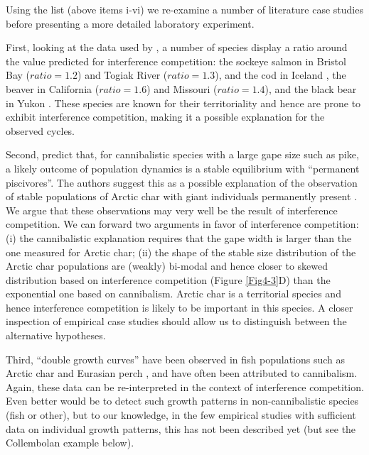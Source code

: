 Using the list (above items i-vi) we re-examine a number of literature case
studies before presenting a more detailed laboratory experiment. 

First, looking at the data used by \textcite{murdoch2002a}, a number of species
display a ratio around the value predicted for interference competition: the
sockeye salmon in Bristol Bay ($ratio=1.2$) and Togiak River ($ratio=1.3$), and
the cod in Iceland \autocite[$ratio=1.6$,]{myers1995a}, the beaver in California
($ratio=1.6$) and Missouri ($ratio=1.4$), and the black bear in Yukon
\autocite[$ratio=1.5$,]{novak1987a}.
These species are known for their territoriality
\autocites{foote1990a,nolet1994a,marshall2010a,sverdrup2011a,ping2011a} and hence
are prone to exhibit interference competition, making it a possible explanation
for the observed cycles.

Second, \textcite{claessen2002a} predict that, for cannibalistic species with a
large gape size such as pike, a likely outcome of population dynamics is a
stable equilibrium with “permanent piscivores”. The authors suggest this as a
possible explanation of the observation of stable populations of Arctic char
with giant individuals permanently present
\autocites{parker1991a,griffiths1994a,hammar2000a}. We argue that these
observations may very well be the result of interference competition. We can
forward two arguments in favor of interference competition: (i) the
cannibalistic explanation requires that the gape width is larger than the one
measured for Arctic char; (ii) the shape of the stable size distribution of the
Arctic char populations are (weakly) bi-modal and hence closer to skewed
distribution based on interference competition (Figure \ref{Fig4-3}D) than the
exponential one based on cannibalism. Arctic char is a territorial species and
hence interference competition is likely to be important in this species. A
closer inspection of empirical case studies should allow us to distinguish
between the alternative hypotheses.

Third, “double growth curves” have been observed in fish populations such as
Arctic char and Eurasian perch \autocites{cren1992a}, and have often been
attributed to cannibalism. Again, these data can be re-interpreted in the
context of interference competition. Even better would be to detect such growth
patterns in non-cannibalistic species (fish or other), but to our knowledge, in
the few empirical studies with sufficient data on individual growth patterns,
this has not been described yet (but see the Collembolan example below).

